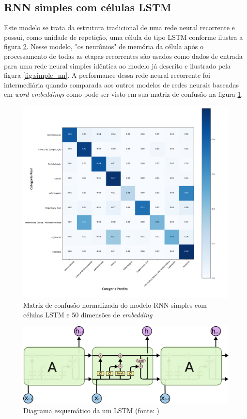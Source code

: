 \subsection{RNN simples com células LSTM} \label{section:RNN_simple}

Este modelo se trata da estrutura tradicional de uma rede neural recorrente e possui, como unidade de repetição, uma célula do tipo LSTM conforme ilustra a figura \ref{fig:LSTM}. Nesse modelo, "os neurônios" de memória da célula após o processamento de todas as etapas recorrentes são usados como dados de entrada para uma rede neural simples idêntica ao modelo já descrito e ilustrado pela figura \ref{fig:simple_nn}. A performance dessa rede neural recorrente foi intermediária quando comparada aos outros modelos de redes neurais baseadas em \textit{word embeddings} como pode ser visto em sua matriz de confusão na figura \ref{fig:LSTM_CONF}.

\begin{figure}[!ht]
	\centering
	\includegraphics[width=1.0\textwidth]{figures/lstm_confusion.png}
	\caption{Matriz de confusão normalizada do modelo RNN simples com células LSTM e 50 dimensões de \textit{embedding} }
	\label{fig:LSTM_CONF}
\end{figure}

\begin{figure}[!ht]
	\centering
	\includegraphics[width=1.0\textwidth]{figures/LSTM3-chain.png}
	\caption{Diagrama esquemático da um LSTM (fonte: \cite{ColahLSTM})}
	\label{fig:LSTM}
\end{figure}

